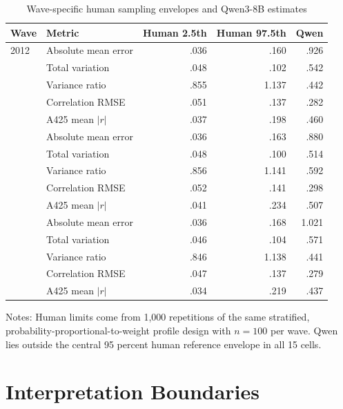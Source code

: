 \documentclass[11pt]{article}
\begin{document}
\begin{table}[!htbp]
\centering
\caption{Wave-specific human sampling envelopes and Qwen3-8B estimates}
\label{tab:s12-sampling-envelope}
\begin{threeparttable}
\scriptsize
\begin{tabular}{llrrr}
\toprule
Wave & Metric & Human 2.5th & Human 97.5th & Qwen \\
\midrule
2012 & Absolute mean error & .036 & .160 & .926 \\
     & Total variation & .048 & .102 & .542 \\
     & Variance ratio & .855 & 1.137 & .442 \\
     & Correlation RMSE & .051 & .137 & .282 \\
     & A425 mean $|r|$ & .037 & .198 & .460 \\
\addlinespace
2018 & Absolute mean error & .036 & .163 & .880 \\
     & Total variation & .048 & .100 & .514 \\
     & Variance ratio & .856 & 1.141 & .592 \\
     & Correlation RMSE & .052 & .141 & .298 \\
     & A425 mean $|r|$ & .041 & .234 & .507 \\
\addlinespace
2021 & Absolute mean error & .036 & .168 & 1.021 \\
     & Total variation & .046 & .104 & .571 \\
     & Variance ratio & .846 & 1.138 & .441 \\
     & Correlation RMSE & .047 & .137 & .279 \\
     & A425 mean $|r|$ & .034 & .219 & .437 \\
\bottomrule
\end{tabular}
\begin{tablenotes}[flushleft]
\footnotesize
\item Notes: Human limits come from 1,000 repetitions of the same stratified,
probability-proportional-to-weight profile design with $n=100$ per wave. Qwen lies outside the
central 95 percent human reference envelope in all 15 cells.
\end{tablenotes}
\end{threeparttable}
\end{table}

\section{Interpretation Boundaries}
\enlargethispage{5\baselineskip}
\end{document}
